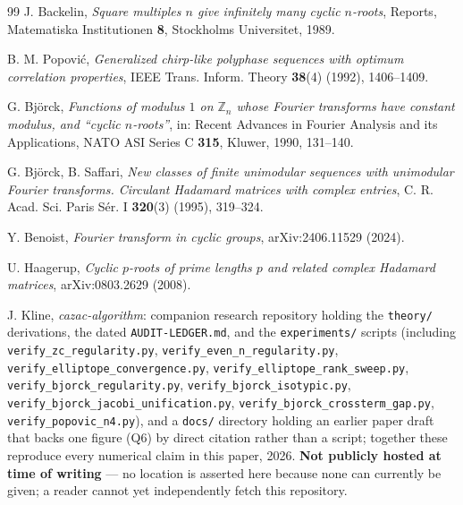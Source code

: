 \documentclass[11pt]{article}
\theoremstyle{plain}
\theoremstyle{definition}
\theoremstyle{remark}
\newcommand{\Z}{\mathbb Z}
\begin{document}
\begin{thebibliography}{99}
 J. Backelin, \emph{Square multiples $n$ give
infinitely many cyclic $n$-roots}, Reports, Matematiska Institutionen
\textbf{8}, Stockholms Universitet, 1989.

 B. M. Popovi\'c, \emph{Generalized chirp-like
polyphase sequences with optimum correlation properties}, IEEE Trans.
Inform. Theory \textbf{38}(4) (1992), 1406--1409.

 G. Bj\"orck, \emph{Functions of modulus $1$ on $\Z_n$
whose Fourier transforms have constant modulus, and ``cyclic $n$-roots''},
in: Recent Advances in Fourier Analysis and its Applications, NATO ASI
Series C \textbf{315}, Kluwer, 1990, 131--140.

 G. Bj\"orck, B. Saffari, \emph{New classes of
finite unimodular sequences with unimodular Fourier transforms. Circulant
Hadamard matrices with complex entries}, C. R. Acad. Sci. Paris S\'er. I
\textbf{320}(3) (1995), 319--324.

 Y. Benoist, \emph{Fourier transform in cyclic groups},
arXiv:2406.11529 (2024).

 U. Haagerup, \emph{Cyclic $p$-roots of prime lengths
$p$ and related complex Hadamard matrices}, arXiv:0803.2629 (2008).

 J. Kline, \emph{cazac-algorithm}: companion
research repository holding the {\tt theory/} derivations, the dated
{\tt AUDIT-LEDGER.md}, and the {\tt experiments/} scripts (including
{\tt verify\_zc\_regularity.py}, {\tt verify\_even\_n\_regularity.py},
{\tt verify\_elliptope\_convergence.py}, {\tt verify\_elliptope\_rank\_sweep.py},
{\tt verify\_bjorck\_regularity.py}, {\tt verify\_bjorck\_isotypic.py},
{\tt verify\_bjorck\_jacobi\_unification.py},
{\tt verify\_bjorck\_crossterm\_gap.py}, {\tt verify\_popovic\_n4.py}), and
a {\tt docs/} directory holding an earlier paper draft that backs one
figure (Q6) by direct citation rather than a script; together these
reproduce every numerical claim in this paper, 2026. \textbf{Not publicly
hosted at time of writing} --- no location is asserted here because none
can currently be given; a reader cannot yet independently fetch this
repository.

\end{thebibliography}
\end{document}
